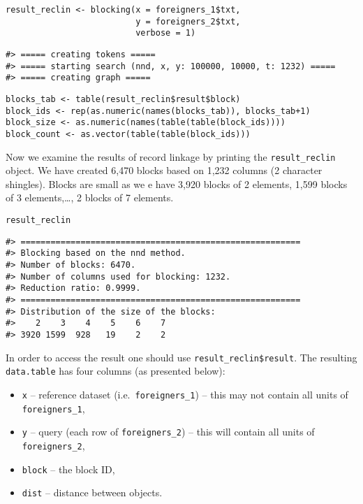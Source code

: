 \begin{verbatim}
result_reclin <- blocking(x = foreigners_1$txt,
                          y = foreigners_2$txt,
                          verbose = 1)
\end{verbatim}

\begin{verbatim}
#> ===== creating tokens =====
#> ===== starting search (nnd, x, y: 100000, 10000, t: 1232) =====
#> ===== creating graph =====
\end{verbatim}

\begin{verbatim}
blocks_tab <- table(result_reclin$result$block)
block_ids <- rep(as.numeric(names(blocks_tab)), blocks_tab+1)
block_size <- as.numeric(names(table(table(block_ids))))
block_count <- as.vector(table(table(block_ids)))
\end{verbatim}

Now we examine the results of record linkage by printing the \texttt{result\_reclin} object. We have created
6,470 blocks based on
1,232 columns (2 character shingles). Blocks are small as we e have 3,920 blocks of 2 elements,
1,599 blocks of 3 elements,\ldots,
2 blocks of 7 elements.

\begin{verbatim}
result_reclin
\end{verbatim}

\begin{verbatim}
#> ========================================================
#> Blocking based on the nnd method.
#> Number of blocks: 6470.
#> Number of columns used for blocking: 1232.
#> Reduction ratio: 0.9999.
#> ========================================================
#> Distribution of the size of the blocks:
#>    2    3    4    5    6    7 
#> 3920 1599  928   19    2    2
\end{verbatim}

In order to access the result one should use \texttt{result\_reclin\$result}. The resulting \texttt{data.table} has four columns (as presented below):

\begin{itemize}
\tightlist
\item
  \texttt{x} -- reference dataset (i.e.~\texttt{foreigners\_1}) -- this may not
  contain all units of \texttt{foreigners\_1},
\item
  \texttt{y} -- query (each row of \texttt{foreigners\_2}) -- this will contain all units of \texttt{foreigners\_2},
\item
  \texttt{block} -- the block ID,
\item
  \texttt{dist} -- distance between objects.
\end{itemize}

